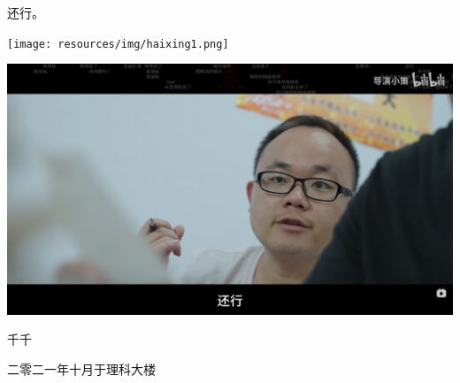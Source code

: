 \newpage
{\kaishu
  \begin{center}
    \LARGE\bfseries{}
  \end{center}

    还行。

  \centering
  \texttt{[image: resources/img/haixing1.png]}
  
  \centering
  \includegraphics[scale=0.10]{resources/img/haixing2.png}

  \vspace{1cm} \hspace{9.8cm}  千千

  \hspace{8cm}
} 二零二一年十月于理科大楼